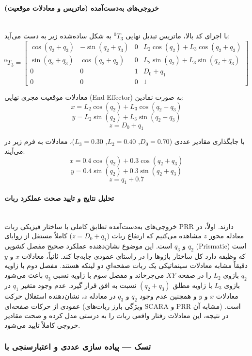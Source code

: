 \documentclass{article}
\begin{document}
\paragraph{خروجی‌های به‌دست‌آمده (ماتریس و معادلات موقعیت)}\mbox{}\\
با اجرای کد بالا، ماتریس تبدیل نهایی $^0T_3$ به شکل ساده‌شده زیر به دست می‌آید:
$$
^0T_3 = \begin{bmatrix}
	\cos(q_2 + q_3) & -\sin(q_2 + q_3) & 0 & L_2\cos(q_2) + L_3\cos(q_2 + q_3) \\
	\sin(q_2 + q_3) & \cos(q_2 + q_3) & 0 & L_2\sin(q_2) + L_3\sin(q_2 + q_3) \\
	0 & 0 & 1 & D_0 + q_1 \\
	0 & 0 & 0 & 1
\end{bmatrix}
$$

معادلات موقعیت مجری نهایی (End-Effector) به صورت نمادین:
$$ x = L_2 \cos(q_2) + L_3 \cos(q_2 + q_3) $$
$$ y = L_2 \sin(q_2) + L_3 \sin(q_2 + q_3) $$
$$ z = D_0 + q_1 $$

با جایگذاری مقادیر عددی ($D_0=0.70$, $L_2=0.40$, $L_3=0.30$)، معادلات به فرم زیر در می‌آیند:
$$ x = 0.4 \cos(q_2) + 0.3 \cos(q_2 + q_3) $$
$$ y = 0.4 \sin(q_2) + 0.3 \sin(q_2 + q_3) $$
$$ z = q_1 + 0.7 $$

\paragraph{تحلیل نتایج و تایید صحت عملکرد ربات}\mbox{}\\
خروجی‌های به‌دست‌آمده تطابق کاملی با ساختار فیزیکی ربات PRR دارند. 
اولاً، در معادله محور $z$ مشاهده می‌کنیم که ارتفاع ربات ($z = D_0 + q_1$) کاملاً مستقل از زوایای $q_2$ و $q_3$ است. این موضوع نشان‌دهنده عملکرد صحیح مفصل کشویی (Prismatic) است که وظیفه دارد کل ساختار بازوها را در راستای عمودی جابه‌جا کند.
ثانیاً، معادلات $x$ و $y$ دقیقاً مشابه معادلات سینماتیکی یک ربات صفحه‌ایِ دو لینکه  هستند. مفصل دوم با زاویه $q_2$ بازوی $L_2$ را در صفحه $XY$ می‌چرخاند و مفصل سوم با زاویه نسبی $q_3$ باعث می‌شود بازوی $L_3$ با زاویه مطلق $(q_2 + q_3)$ نسبت به افق قرار گیرد.
عدم وجود متغیر $q_1$ در معادلات $x$ و $y$ و همچنین عدم وجود $q_2$ و $q_3$ در معادله $z$، نشان‌دهنده استقلال حرکت عمودی از حرکات صفحه‌ای (ویژگی بارز ربات‌های SCARA و PRR مشابه آن) است. در نتیجه، این معادلات رفتار واقعی ربات را به درستی مدل کرده و صحت مقادیر خروجی کاملاً تایید می‌شود.
\subsubsection{تسک  — پیاده سازی عددی و اعتبارسنجی با }
\end{document}
